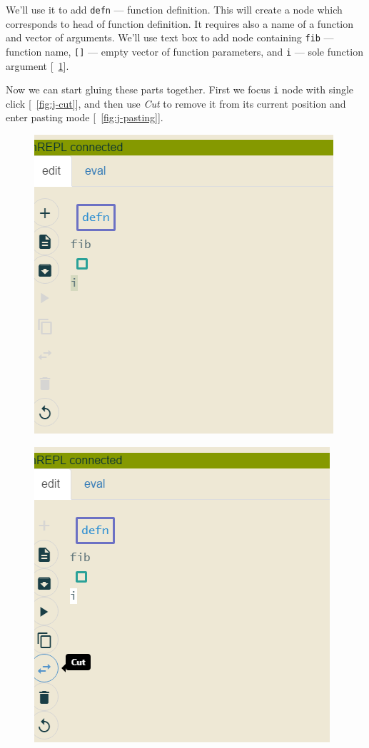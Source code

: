 \documentclass[11pt]{scrartcl}
\newcommand*{\figref}[1]{[\textbf{\figurename}~\ref{#1}]}
\begin{document}
We'll use it to add \lstinline|defn| --- function definition. This will create a
node which corresponds to head of function definition. It requires also a name of
a function and vector of arguments. We'll use text box to add node containing
\lstinline|fib| --- function name, \lstinline|[]| --- empty vector of function
parameters, and \lstinline|i| --- sole function argument \figref{fig:j-fib_parts}.

Now we can start gluing these parts together. First we focus \lstinline|i| node
with single click \figref{fig:j-cut}, and then use \textit{Cut} to remove it from its current
position and enter pasting mode \figref{fig:j-pasting}.

\begin{figure}[hbt]
  \centering
  \begin{minipage}{0.48\textwidth}
    \centering
    \includegraphics[scale=0.3]{img/j-fib_parts}
\label{fig:j-fib_parts}
  \end{minipage}
  \begin{minipage}{0.48\textwidth}
    \centering
    \includegraphics[scale=0.3]{img/j-cut}

\end{minipage}
\end{figure}
\end{document}
